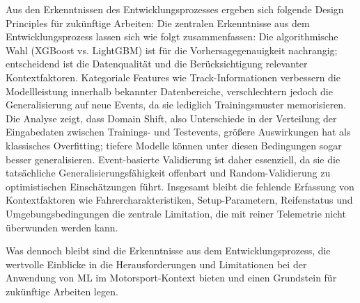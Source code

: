 Aus den Erkenntnissen des Entwicklungsprozesses ergeben sich folgende Design Principles für zukünftige Arbeiten:
Die zentralen Erkenntnisse aus dem Entwicklungsprozess lassen sich wie folgt zusammenfassen: Die algorithmische Wahl (XGBoost vs. LightGBM) ist für die Vorhersagegenauigkeit nachrangig; entscheidend ist die Datenqualität und die Berücksichtigung relevanter Kontextfaktoren. Kategoriale Features wie Track-Informationen verbessern die Modellleistung innerhalb bekannter Datenbereiche, verschlechtern jedoch die Generalisierung auf neue Events, da sie lediglich Trainingsmuster memorisieren. Die Analyse zeigt, dass Domain Shift, also Unterschiede in der Verteilung der Eingabedaten zwischen Trainings- und Testevents, größere Auswirkungen hat als klassisches Overfitting; tiefere Modelle können unter diesen Bedingungen sogar besser generalisieren. Event-basierte Validierung ist daher essenziell, da sie die tatsächliche Generalisierungsfähigkeit offenbart und Random-Validierung zu optimistischen Einschätzungen führt. Insgesamt bleibt die fehlende Erfassung von Kontextfaktoren wie Fahrercharakteristiken, Setup-Parametern, Reifenstatus und Umgebungsbedingungen die zentrale Limitation, die mit reiner Telemetrie nicht überwunden werden kann.

Was dennoch bleibt sind die Erkenntnisse aus dem Entwicklungsprozess, die wertvolle Einblicke in die Herausforderungen und Limitationen bei der Anwendung von \ac{ML} im Motorsport-Kontext bieten und einen Grundstein für zukünftige Arbeiten legen.
